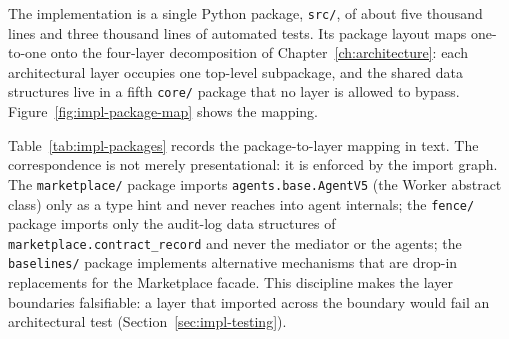The implementation is a single Python package, \texttt{src/}, of about
five thousand lines and three thousand lines of automated tests. Its
package layout maps one-to-one onto the four-layer decomposition of
Chapter~\ref{ch:architecture}: each architectural layer occupies one
top-level subpackage, and the shared data structures live in a fifth
\texttt{core/} package that no layer is allowed to bypass.
Figure~\ref{fig:impl-package-map} shows the mapping.


Table~\ref{tab:impl-packages} records the package-to-layer mapping in
text. The correspondence is not merely presentational: it is enforced
by the import graph. The \texttt{marketplace/} package imports
\texttt{agents.base.AgentV5} (the Worker abstract class) only as a type
hint and never reaches into agent internals; the \texttt{fence/}
package imports only the audit-log data structures of
\texttt{marketplace.contract\_record} and never the mediator or the
agents; the \texttt{baselines/} package implements alternative
mechanisms that are drop-in replacements for the Marketplace facade.
This discipline makes the layer boundaries falsifiable: a layer that
imported across the boundary would fail an architectural test
(Section~\ref{sec:impl-testing}).

